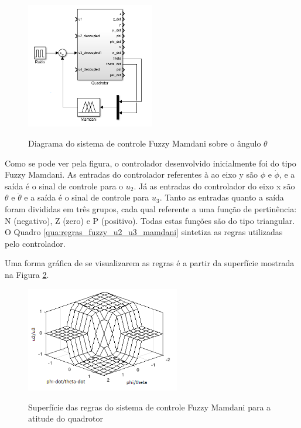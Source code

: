 \begin{figure}[!htb]
    \centering
    \caption{Diagrama do sistema de controle Fuzzy Mamdani sobre o ângulo $\theta$}
    \includegraphics[width=0.5\textwidth]{./04-figuras/resultados/fis_u3/u3_mamdani_blocks}
    \label{fig:u3_mamdani_blocks}
\end{figure}

Como se pode ver pela figura, o controlador desenvolvido inicialmente foi do tipo Fuzzy Mamdani. As entradas do controlador referentes à ao eixo y são $\phi$ e $\dot{\phi}$, e a saída é o sinal de controle para o $u_2$. Já as entradas do controlador do eixo x são $\theta$ e $\dot{\theta}$ e a saída é o sinal de controle para $u_3$. Tanto as entradas quanto a saída foram divididas em três grupos, cada qual referente a uma função de pertinência: N (negativo), Z (zero) e P (positivo). Todas estas funções são do tipo triangular. O Quadro \ref{qua:regras_fuzzy_u2_u3_mamdani} sintetiza as regras utilizadas pelo controlador.



Uma forma gráfica de se visualizarem as regras é a partir da superfície mostrada na Figura \ref{fig:u2_u3_mamdani_surface}.

\begin{figure}[!htb]
    \centering
    \caption{Superfície das regras do sistema de controle Fuzzy Mamdani para a atitude do quadrotor}
    \includegraphics[width=0.6\textwidth]{./04-figuras/resultados/fis_u2/u2_u3_mamdani_surface}
    \label{fig:u2_u3_mamdani_surface}
\end{figure}

